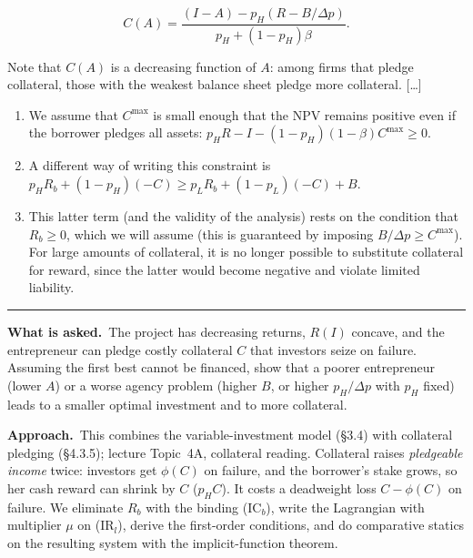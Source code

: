 \documentclass[11pt,a4paper]{article}
\newcommand{\asked}{\par\medskip\noindent\textbf{What is asked.}~}
\newcommand{\approach}{\par\smallskip\noindent\textbf{Approach.}~}
\newcommand{\stmtend}{\par\endgroup\nopagebreak\noindent\rule{\linewidth}{0.4pt}\par\medskip}
\begin{document}
\[C(A) = \frac{(I - A) - p_H(R - B/\Delta p)}{p_H + (1 - p_H)\beta}.\]

Note that \(C(A)\) is a decreasing function of \(A\): among firms that pledge collateral, those with
the weakest balance sheet pledge more collateral. {[}\ldots{]}

\begin{enumerate}
\def\labelenumi{\arabic{enumi}.}
\setcounter{enumi}{21}
\item
  We assume that \(C^{\max}\) is small enough that the NPV remains positive even if the borrower
  pledges all assets: \(p_H R - I - (1 - p_H)(1 - \beta)C^{\max} \geqslant 0\).
\item
  A different way of writing this constraint is
  \(p_H R_b + (1 - p_H)(-C) \geqslant p_L R_b + (1 - p_L)(-C) + B\).
\item
  This latter term (and the validity of the analysis) rests on the condition that
  \(R_b \geqslant 0\), which we will assume (this is guaranteed by imposing
  \(B/\Delta p \geqslant C^{\max}\)). For large amounts of collateral, it is no longer possible to
  substitute collateral for reward, since the latter would become negative and violate limited
  liability.
\end{enumerate}
\stmtend

\asked The project has decreasing returns, $R(I)$ concave, and the entrepreneur can pledge costly
collateral $C$ that investors seize on failure. Assuming the first best cannot be financed, show
that a poorer entrepreneur (lower $A$) or a worse agency problem (higher $B$, or higher $p_H/\Delta p$
with $p_H$ fixed) leads to a smaller optimal investment and to more collateral.

\approach This combines the variable-investment model (\S3.4) with collateral pledging (\S4.3.5);
lecture Topic~4A, collateral reading. Collateral raises \emph{pledgeable income} twice: investors get
$\phi(C)$ on failure, and the borrower's stake grows, so her cash reward can shrink by $C$ ($p_HC$).
It costs a deadweight loss $C-\phi(C)$ on failure. We eliminate $R_b$ with the binding (IC$_b$),
write the Lagrangian with multiplier $\mu$ on (IR$_l$), derive the first-order conditions, and do
comparative statics on the resulting system with the implicit-function theorem.
\end{document}
